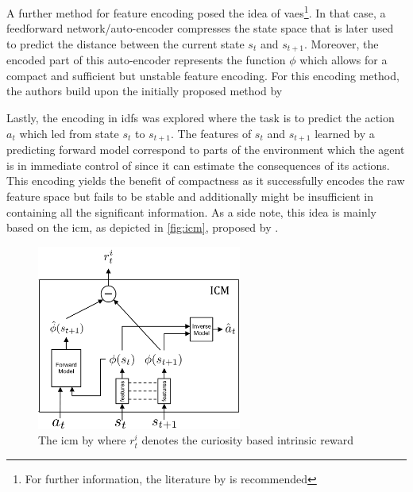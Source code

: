 \documentclass[draft,final]{vutinfth} %
\newcommand{\p}[1]{see p. #1}
\begin{document}
    A further method for feature encoding posed the idea of \glspl{vae}\footnote{For further information, the literature by \citet[\p{207-214}]{aggarwal_neural_2018} is recommended}.
    In that case, a feedforward network/auto-encoder compresses the state space that is later used to predict the distance between the current state $s_t$ and $s_{t+1}$.
    Moreover, the encoded part of this auto-encoder represents the function $\phi$ which allows for a compact and sufficient but unstable feature encoding.
    For this encoding method, the authors build upon the initially proposed method by~\citeauthor{stadie_incentivizing_2015}

    Lastly, the encoding in \glspl{idf} was explored where the task is to predict the action $a_t$ which led from state $s_t$ to $s_{t+1}$.
    The features of $s_t$ and $s_{t+1}$ learned by a predicting forward model correspond to parts of the environment which the agent is in immediate control of since it can estimate the consequences of its actions.
    This encoding yields the benefit of compactness as it successfully encodes the raw feature space but fails to be stable and additionally might be insufficient in containing all the significant information.
    As a side note, this idea is mainly based on the \gls{icm}, as depicted in \autoref{fig:icm}, proposed by \citet{pathak_curiosity-driven_2017-1}.

    \begin{figure}[h]
        \centering
        \includegraphics[width=0.6\textwidth]{figures/icm.png}
        \caption[The \acrlong{icm} introduced in ""]{The \gls{icm} by \citet{pathak_curiosity-driven_2017-1} where $r_t^i$ denotes the curiosity based intrinsic reward\protect\footnotemark}
        \label{fig:icm}
    \end{figure}
\end{document}
